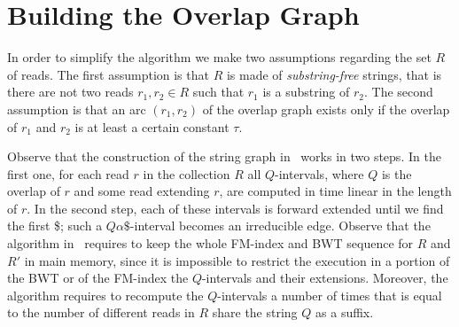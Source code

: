 \documentclass[runningheads,envcountsame,a4paper]{llncs}
\newcommand{\notaestesa}[2]{%
 \marginpar{\color{red!75!black}\textbf{\texttimes}}%
 {\color{red!75!black}%
 [\,\textbullet\,\textsf{\textbf{#1:}} %
 \textsf{\footnotesize#2}\,\textbullet\,]}%
}
\newcommand{\MP}[1]{\notaestesa{MP}{#1}}
\begin{document}
\section{Building the Overlap Graph}







In order to simplify the algorithm we make two assumptions regarding the set $R$
of reads.
The first assumption is that $R$ is made of \emph{substring-free} strings, that is there are not two reads $r_{1}, r_{2}\in R$ such that
$r_{1}$  is a substring of  $r_{2}$.
The second assumption is that an arc $(r_{1}, r_{2})$ of the overlap graph exists only if the overlap of $r_{1}$ and $r_{2}$ is at least a certain constant $\tau$.



Observe that the construction of the string graph in~\cite{Simpson2010} works in two
steps.
In the first one, for each read $r$ in the collection $R$ all
$Q$-intervals, where $Q$ is the overlap of $r$ and some read extending $r$,
are computed in time linear in
the  length of $r$.
In the second step, each of these intervals is forward extended until
we find the first \$; such a $Q\alpha\$$-interval becomes an
irreducible edge.
Observe that the algorithm  in~\cite{Simpson2010} requires to keep the whole FM-index
and BWT sequence for $R$ and $R'$ in main memory, since it is impossible to
restrict the execution in a portion of the BWT or of the FM-index the $Q$-intervals
and their extensions.
Moreover, the algorithm requires to recompute the $Q$-intervals a number of
times that is equal to the number of different reads in $R$ share the
string $Q$ as a suffix.
\end{document}
